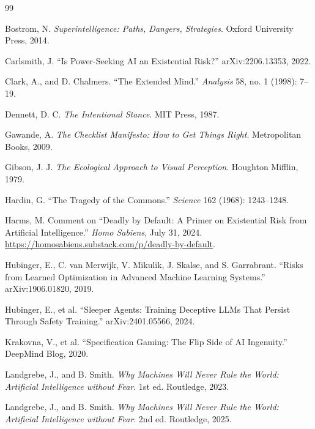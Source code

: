 \documentclass[11pt]{article}
\begin{document}
\begin{thebibliography}{99}

Bostrom, N. \textit{Superintelligence: Paths, Dangers, Strategies}. Oxford University Press, 2014.

Carlsmith, J. ``Is Power-Seeking AI an Existential Risk?'' arXiv:2206.13353, 2022.

Clark, A., and D. Chalmers. ``The Extended Mind.'' \textit{Analysis} 58, no. 1 (1998): 7--19.

Dennett, D. C. \textit{The Intentional Stance}. MIT Press, 1987.

Gawande, A. \textit{The Checklist Manifesto: How to Get Things Right}. Metropolitan Books, 2009.

Gibson, J. J. \textit{The Ecological Approach to Visual Perception}. Houghton Mifflin, 1979.

Hardin, G. ``The Tragedy of the Commons.'' \textit{Science} 162 (1968): 1243--1248.

Harms, M. Comment on ``Deadly by Default: A Primer on Existential Risk from Artificial Intelligence.'' \textit{Homo Sabiens}, July 31, 2024. \url{https://homosabiens.substack.com/p/deadly-by-default}.

Hubinger, E., C. van Merwijk, V. Mikulik, J. Skalse, and S. Garrabrant. ``Risks from Learned Optimization in Advanced Machine Learning Systems.'' arXiv:1906.01820, 2019.

Hubinger, E., et al. ``Sleeper Agents: Training Deceptive LLMs That Persist Through Safety Training.'' arXiv:2401.05566, 2024.

Krakovna, V., et al. ``Specification Gaming: The Flip Side of AI Ingenuity.'' DeepMind Blog, 2020.

Landgrebe, J., and B. Smith. \textit{Why Machines Will Never Rule the World: Artificial Intelligence without Fear}. 1st ed. Routledge, 2023.

Landgrebe, J., and B. Smith. \textit{Why Machines Will Never Rule the World: Artificial Intelligence without Fear}. 2nd ed. Routledge, 2025.


\end{thebibliography}
\end{document}
